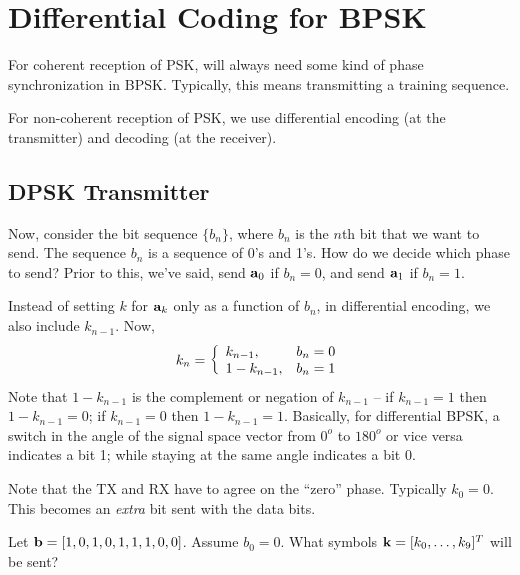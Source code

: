 \section{Differential Coding for BPSK}


%
%

For coherent reception of PSK, will always need some kind of phase
synchronization in BPSK.   Typically, this means transmitting a
training sequence.

For non-coherent reception of PSK, we use differential encoding (at
the transmitter) and decoding (at the receiver).

\subsection{DPSK Transmitter}

Now, consider the bit sequence $\{b_n\}$, where $b_n$ is the $n$th
bit that we want to send.  The sequence $b_n$ is a sequence of 0's
and 1's. How do we decide which phase to send? Prior to this, we've
said, send $\mathbf{a}_0$ if $b_n=0$, and send $\mathbf{a}_1$ if $b_n = 1$.

Instead of setting $k$ for $\mathbf{a}_k$ only as a function of $b_n$, in
differential encoding, we also include $k_{n-1}$.  Now,
\[
 k_n = { \left\{\begin{array}{ll} {k_{n-1}}, & {b_n=0} \\ {1-k_{n-1}}, & {b_n=1} \end{array}\right. }
\]
Note that $1-k_{n-1}$ is the complement or negation of $k_{n-1}$ --
if $k_{n-1}=1$ then $1-k_{n-1}=0$; if $k_{n-1}=0$ then
$1-k_{n-1}=1$. Basically, for differential BPSK, a switch in the
angle of the signal space vector from $0^o$ to $180^o$ or vice versa
indicates a bit 1; while staying at the same angle indicates a bit
0.

Note that the TX and RX have to agree on the ``zero'' phase.  Typically
$k_{0}=0$.  This becomes an \emph{extra} bit sent with the data bits.


Let $\mathbf{b} = [1, 0, 1, 0, 1, 1, 1, 0, 0 ]$.  Assume $b_0=0$.
 What symbols $\mathbf{k} = [ k_0, \ldots, k_9]^T$ will be sent?


